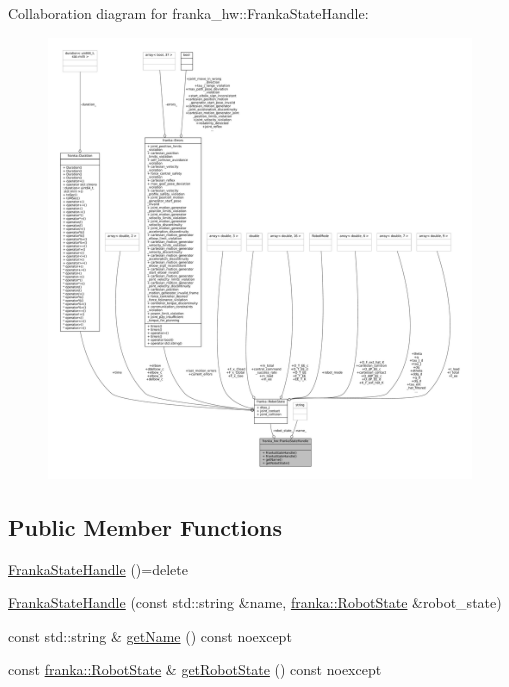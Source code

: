 Collaboration diagram for franka\+\_\+hw\+:\+:Franka\+State\+Handle\+:
\nopagebreak
\begin{figure}[H]
\begin{center}
\leavevmode
\includegraphics[width=350pt]{classfranka__hw_1_1FrankaStateHandle__coll__graph}
\end{center}
\end{figure}
\subsection*{Public Member Functions}
\begin{DoxyCompactItemize}
\item 
\hyperlink{classfranka__hw_1_1FrankaStateHandle_a53fa76e902a8181d42795379369c8044}{Franka\+State\+Handle} ()=delete
\item 
\hyperlink{classfranka__hw_1_1FrankaStateHandle_aa1e678a0ad409591d0ee19b9e45f19c6}{Franka\+State\+Handle} (const std\+::string \&name, \hyperlink{structfranka_1_1RobotState}{franka\+::\+Robot\+State} \&robot\+\_\+state)
\item 
const std\+::string \& \hyperlink{classfranka__hw_1_1FrankaStateHandle_a8b1665ba53cdb85555b0e0ca6de58d0f}{get\+Name} () const noexcept
\item 
const \hyperlink{structfranka_1_1RobotState}{franka\+::\+Robot\+State} \& \hyperlink{classfranka__hw_1_1FrankaStateHandle_a6e0be7a9ae6e86394ea273f9a84c11cb}{get\+Robot\+State} () const noexcept
\end{DoxyCompactItemize}
